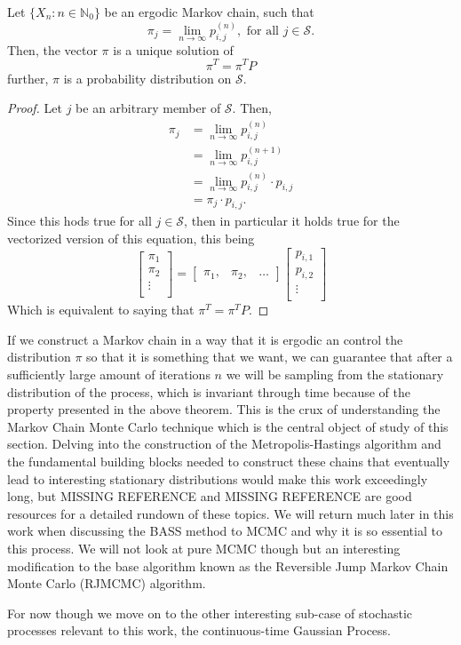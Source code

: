 \begin{theorem}
	Let $\{ X_n: n \in \mathbb{N}_0\}$ be an ergodic Markov chain, such that 
	\[ \pi_j = \lim_{n \rightarrow \infty} p_{i,j}^{(n)}, \text{ for all } j \in \mathcal{S}. \]
	Then, the vector $\pi$ is a unique solution of 
	\[ \pi^T = \pi^T P \]
	further, $\pi$ is a probability distribution on $\mathcal{S}$. 
\end{theorem}

\begin{proof}
	Let $j$ be an arbitrary member of $\mathcal{S}$. Then, 
	\begin{align*}
		\pi_j &= \lim_{n \rightarrow \infty} p_{i,j}^{(n)} \\
		&= \lim_{n \rightarrow \infty} p_{i,j}^{(n+1)} \\
		&= \lim_{n \rightarrow \infty} p_{i,j}^{(n)} \cdot p_{i,j} \\
		&= \pi_j \cdot p_{i,j}.
	\end{align*}
	Since this hods true for all $j \in \mathcal{S}$, then in particular it holds true for the vectorized version of this equation, this being 
	\[ \begin{bmatrix}
		\pi_1 \\
		\pi_2 \\
		\vdots \\
	\end{bmatrix} = 
	\begin{bmatrix}
		\pi_1, &
		\pi_2, &
		\ldots 
	\end{bmatrix} 
	\begin{bmatrix}
		p_{i,1} \\
		p_{i,2} \\
		\vdots \\
	\end{bmatrix} \]
Which is equivalent to saying that $\pi^T = \pi^T P$.
\end{proof}

If we construct a Markov chain in a way that it is ergodic an control the distribution $\pi$ so that it is something that we want, we can guarantee that after a sufficiently large amount of iterations $n$ we will be sampling from the stationary distribution of the process, which is invariant through time because of the property presented in the above theorem. This is the crux of understanding the Markov Chain Monte Carlo technique which is the central object of study of this section. Delving into the construction of the Metropolis-Hastings algorithm and the fundamental building blocks needed to construct these chains that eventually lead to interesting stationary distributions would make this work exceedingly long, but MISSING REFERENCE and MISSING REFERENCE are good resources for a detailed rundown of these topics. We will return much later in this work when discussing the BASS method to MCMC and why it is so essential to this process. We will not look at pure MCMC though but an interesting modification to the base algorithm known as the Reversible Jump Markov Chain Monte Carlo (RJMCMC) algorithm. 

For now though we move on to the other interesting sub-case of stochastic processes relevant to this work, the continuous-time Gaussian Process. 



